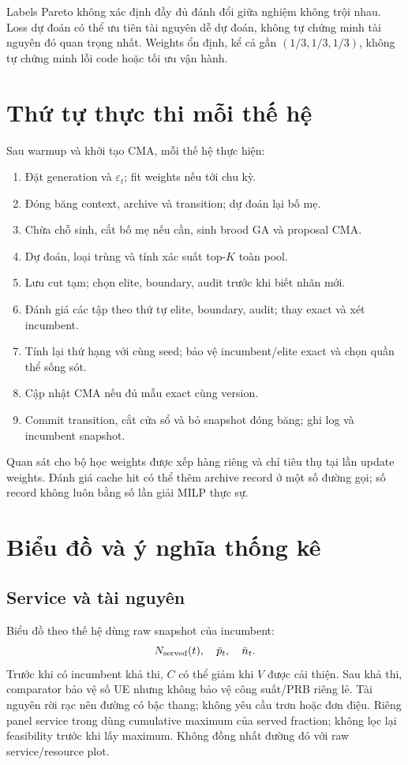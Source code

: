 \documentclass[11pt,a4paper]{article}
\newcommand{\code}[1]{\texttt{\detokenize{#1}}}
\begin{document}
Labels Pareto không xác định đầy đủ đánh đổi giữa nghiệm không trội nhau. Loss dự đoán có thể ưu tiên tài nguyên dễ dự đoán, không tự chứng minh tài nguyên đó quan trọng nhất.
Weights ổn định, kể cả gần $(1/3,1/3,1/3)$, không tự chứng minh lỗi code hoặc tối ưu vận hành.

\section{Thứ tự thực thi mỗi thế hệ}
Sau warmup và khởi tạo CMA, mỗi thế hệ thực hiện:
\begin{enumerate}
\item Đặt generation và $\varepsilon_t$; fit weights nếu tới chu kỳ.
\item Đóng băng context, archive và transition; dự đoán lại bố mẹ.
\item Chừa chỗ sinh, cắt bố mẹ nếu cần, sinh brood GA và proposal CMA.
\item Dự đoán, loại trùng và tính xác suất top-$K$ toàn pool.
\item Lưu cut tạm; chọn elite, boundary, audit trước khi biết nhãn mới.
\item Đánh giá các tập theo thứ tự elite, boundary, audit; thay exact và xét incumbent.
\item Tính lại thứ hạng với cùng seed; bảo vệ incumbent/elite exact và chọn quần thể sống sót.
\item Cập nhật CMA nếu đủ mẫu exact cùng version.
\item Commit transition, cắt cửa sổ và bỏ snapshot đóng băng; ghi log và incumbent snapshot.
\end{enumerate}
Quan sát cho bộ học weights được xếp hàng riêng và chỉ tiêu thụ tại lần update weights.
Đánh giá cache hit có thể thêm archive record ở một số đường gọi; số record không luôn bằng số lần giải MILP thực sự.

\section{Biểu đồ và ý nghĩa thống kê}
\subsection{Service và tài nguyên}
Biểu đồ theo thế hệ dùng raw snapshot của incumbent:
\[
N_{\rm served}(t),\quad\bar p_t,\quad\bar n_t.
\]
Trước khi có incumbent khả thi, $C$ có thể giảm khi $V$ được cải thiện. Sau khả thi, comparator bảo vệ số UE nhưng không bảo vệ công suất/PRB riêng lẻ.
Tài nguyên rời rạc nên đường có bậc thang; không yêu cầu trơn hoặc đơn điệu.
Riêng panel service trong \code{draw_figure()} dùng cumulative maximum của served fraction; không lọc lại feasibility trước khi lấy maximum. Không đồng nhất đường đó với raw service/resource plot.
\end{document}

